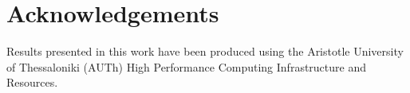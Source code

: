 \section{Acknowledgements}

Results presented in this work have been produced using the Aristotle University
of Thessaloniki (AUTh) High Performance Computing Infrastructure and Resources.